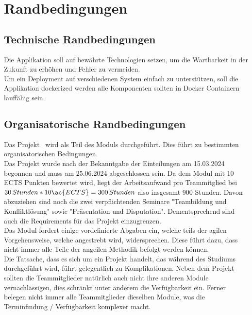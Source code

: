 \chapter{Randbedingungen}\label{ch:randbedingungen}


\section{Technische Randbedingungen}\label{sec:technische-randbedingungen}

Die Applikation soll auf bewährte Technologien setzen, um die Wartbarkeit in der Zukunft zu erhöhen und Fehler zu vermeiden.\\

Um ein Deployment auf verschiedenen System einfach zu unterstützen, soll die Applikation dockerized werden
\dah alle Komponenten sollten in Docker Containern lauffähig sein.


\section{Organisatorische Randbedingungen}\label{sec:organisatorische-randbedingungen}

Das Projekt \workTitel~wird als Teil des Moduls \workTyp durchgeführt.
Dies führt zu bestimmten organisatorischen Bedingungen.\\
Das Projekt wurde nach der Bekanntgabe der Einteilungen am 15.03.2024 begonnen und muss am 25.06.2024 abgeschlossen sein.
Da dem Modul mit 10 \ac{ECTS} Punkten bewertet wird, liegt der Arbeitsaufwand pro Teammitglied bei \(30\,Stunden * 10 \ac{ECTS} = 300\,Stunden\) also insgesamt 900 Stunden.
Davon abzuziehen sind noch die zwei verpflichtenden Seminare "Teambildung und Konfliktlösung" sowie "Präsentation und Disputation".
Dementsprechend sind auch die Requirements für das Projekt einzugrenzen.\\

Das Modul fordert einige vordefinierte Abgaben ein, welche teils der agilen Vorgehensweise, welche angestrebt wird, widersprechen.
Diese führt dazu, dass nicht immer alle Teile der angeilen Methodik befolgt werden können.\\

Die Tatsache, dass es sich um ein Projekt handelt, das während des Studiums durchgeführt wird, führt gelegentlich zu Komplikationen.
Neben dem Projekt sollten die Teammitglieder natürlich auch nicht ihre anderen Module vernachlässigen, dies schränkt unter anderem die Verfügbarkeit ein.
Ferner belegen nicht immer alle Teammitglieder dieselben Module, was die Terminfindung / Verfügbarkeit komplexer macht.